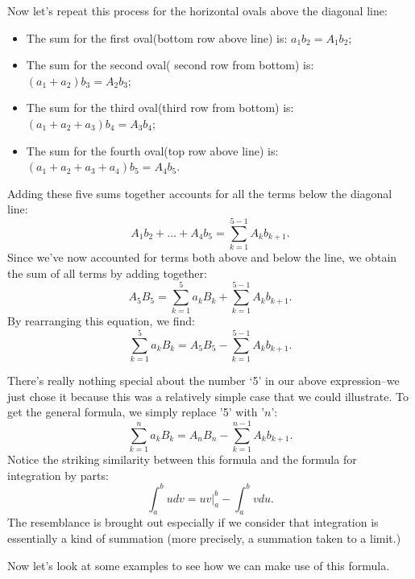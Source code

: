 Now let’s repeat this process for the horizontal ovals above the diagonal line:
\begin{itemize}
\item
The sum for the first oval(bottom row above line) is: $a_{1}b_{2}= A_{1}b_{2}$;
\item
The sum for the second oval( second row from bottom) is: $\left ( a_{1}+a_{2} \right)b_{3}= A_{2}b_{3}$;
\item
The sum for the third oval(third row from bottom) is: $\left ( a_{1}+a_{2}+a_{3} \right )b_{4}= A_{3}b_{4}$;
\item
The sum for the fourth oval(top row above line) is: $\left ( a_{1}+a_{2}+a_{3}+a_{4} \right)b_{5}= A_{4}b_{5}$.
\end{itemize}
Adding these five sums together accounts for all the terms below the diagonal line:
\[ A_1b_2 +  \ldots + A_4b_5 = \sum_{k=1}^{5-1}A_kb_{k+1}.\]
Since we've now accounted for terms both above and below the line, we obtain the sum of all terms by adding together:
\[ A_{5}B_{5}= \sum_{k=1}^{5}a_{k}B_{k}+\sum_{k=1}^{5-1}A_{k}b_{k+1}. \]
By rearranging this equation, we find:
\[ \sum_{k=1}^{5}a_{k}B_{k}= A_{5}B_{5}-\sum_{k=1}^{5-1}A_{k}b_{k+1}. \]

There's really nothing special about the number `5' in our above expression--we just chose it because 
this was a relatively simple case that we could illustrate. To get the general formula, we simply replace '5' with '$n$':
\[\sum_{k=1}^{n}a_{k}B_{k}= A_{n}B_{n}-\sum_{k=1}^{n-1}A_{k}b_{k+1}. \]
Notice the striking similarity between this formula and the formula for integration by parts:
\[ \int_a^b u dv =\left. uv\right|_a^b - \int_a^b v du. \] 
The resemblance is brought out especially if we consider that integration is essentially a kind of summation (more precisely,
a summation taken to a limit.)

Now let’s look at some examples to see how we can make use of this formula.

